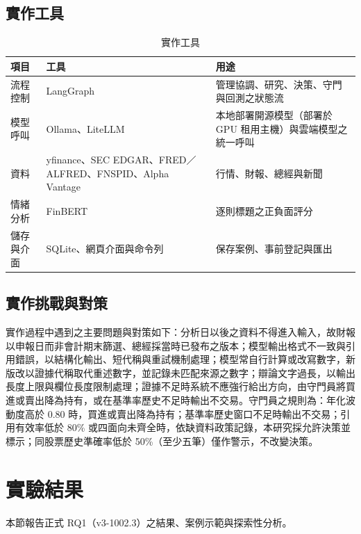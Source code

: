 \documentclass[12pt,a4paper]{article}
\begin{document}
\begin{CJK}{UTF8}{bkai}
\subsection{實作工具}

\begin{table}[H]
\centering\small
\caption{實作工具}
\label{tab:tools}
\begin{tabularx}{\textwidth}{@{}l l Y@{}}
\toprule
項目 & 工具 & 用途 \\
\midrule
流程控制 & LangGraph & 管理協調、研究、決策、守門與回測之狀態流 \\
模型呼叫 & Ollama、LiteLLM & 本地部署開源模型（部署於 GPU 租用主機）與雲端模型之統一呼叫 \\
資料 & yfinance、SEC EDGAR、FRED／ALFRED、FNSPID、Alpha Vantage & 行情、財報、總經與新聞 \\
情緒分析 & FinBERT & 逐則標題之正負面評分 \\
儲存與介面 & SQLite、網頁介面與命令列 & 保存案例、事前登記與匯出 \\
\bottomrule
\end{tabularx}
\end{table}

\subsection{實作挑戰與對策}

實作過程中遇到之主要問題與對策如下：分析日以後之資料不得進入輸入，故財報以申報日而非會計期末篩選、總經採當時已發布之版本；模型輸出格式不一致與引用錯誤，以結構化輸出、短代稱與重試機制處理；模型常自行計算或改寫數字，新版改以證據代稱取代重述數字，並記錄未匹配來源之數字；辯論文字過長，以輸出長度上限與欄位長度限制處理；證據不足時系統不應強行給出方向，由守門員將買進或賣出降為持有，或在基準率歷史不足時輸出不交易。守門員之規則為：年化波動度高於 0.80 時，買進或賣出降為持有；基準率歷史窗口不足時輸出不交易；引用有效率低於 80\% 或四面向未齊全時，依缺資料政策記錄，本研究採允許決策並標示；同股票歷史準確率低於 50\%（至少五筆）僅作警示，不改變決策。

\section{實驗結果}
\label{sec:results}

本節報告正式 RQ1（v3-1002.3）之結果、案例示範與探索性分析。


\end{CJK}
\end{document}
